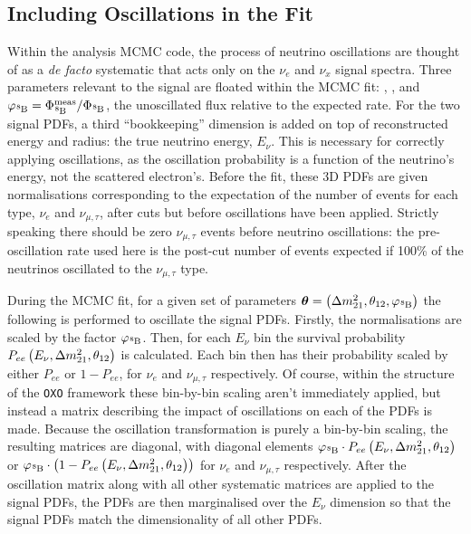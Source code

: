 \subsection{Including Oscillations in the Fit}\label{sec:osc_in_fit}
Within the analysis MCMC code, the process of neutrino oscillations are thought of as a \textit{de facto} systematic that acts only on the \beight{} $\nu_{e}$ and $\nu_{x}$ signal spectra. Three parameters relevant to the signal are floated within the MCMC fit: \dmsq{}, \tonetwo{}, and $\varphi_{\beight{}}=\Phi_{\ce{^{8}B}}^{\mathrm{meas}}/\Phi_{\ce{^{8}B}}$, the unoscillated  flux relative to the expected rate. For the two signal PDFs, a third ``bookkeeping'' dimension is added on top of reconstructed energy and radius: the true neutrino energy, $E_{\nu}$. This is necessary for correctly applying oscillations, as the oscillation probability is a function of the neutrino's energy, not the scattered electron's. Before the fit, these 3D PDFs are given normalisations corresponding to the expectation of the number of events for each type, $\nu_{e}$ and $\nu_{\mu,\tau}$, after cuts but before oscillations have been applied. Strictly speaking there should be zero $\nu_{\mu,\tau}$ events before neutrino oscillations: the pre-oscillation rate used here is the post-cut number of events expected if 100\% of the neutrinos oscillated to the $\nu_{\mu,\tau}$ type.

During the MCMC fit, for a given set of parameters $\bm{\theta} = \left(\dmsq{}, \tonetwo{}, \varphi_{\beight{}}\right)$ the following is performed to oscillate the signal PDFs. Firstly, the normalisations are scaled by the factor $\varphi_{\beight{}}$. Then, for each $E_{\nu}$ bin the survival probability $P_{ee}\left(E_{\nu}, \Delta m^{2}_{21}{}, \theta_{12}{}\right)$ is calculated. Each bin then has their probability scaled by either $P_{ee}$ or $1-P_{ee}$, for $\nu_{e}$ and $\nu_{\mu,\tau}$ respectively. Of course, within the structure of the \texttt{OXO} framework these bin-by-bin scaling aren't immediately applied, but instead a matrix describing the impact of oscillations on each of the PDFs is made. Because the oscillation transformation is purely a bin-by-bin scaling, the resulting matrices are diagonal, with diagonal elements $\varphi_{\beight{}}\cdot P_{ee}\left(E_{\nu}, \dmsq{}, \tonetwo{}\right)$ or $\varphi_{\beight{}}\cdot\left(1-P_{ee}\left(E_{\nu}, \dmsq{}, \tonetwo{}\right)\right)$ for $\nu_{e}$ and $\nu_{\mu,\tau}$ respectively. After the oscillation matrix along with all other systematic matrices are applied to the signal PDFs, the PDFs are then marginalised over the $E_{\nu}$ dimension so that the signal PDFs match the dimensionality of all other PDFs.

